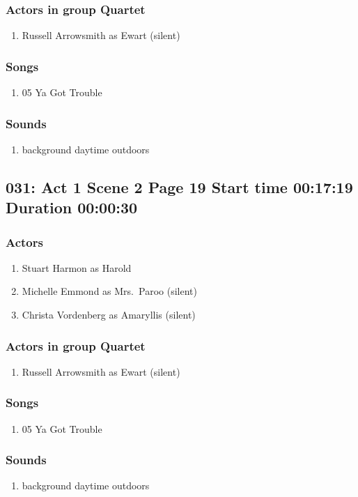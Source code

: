\subsubsection{Actors in group Quartet}
\begin{enumerate}
\item Russell Arrowsmith as Ewart (silent)
\end{enumerate}

\subsubsection{Songs}
\begin{enumerate}
\item 05 Ya Got Trouble
\end{enumerate}\subsubsection{Sounds}
\begin{enumerate}
\item background daytime outdoors
\end{enumerate}
\subsection{031: Act 1 Scene 2 Page 19 Start time 00:17:19 Duration 00:00:30}

\subsubsection{Actors}
\begin{enumerate}
\item Stuart Harmon as Harold
\item Michelle Emmond as Mrs.~Paroo (silent)
\item Christa Vordenberg as Amaryllis (silent)
\end{enumerate}
\subsubsection{Actors in group Quartet}
\begin{enumerate}
\item Russell Arrowsmith as Ewart (silent)
\end{enumerate}

\subsubsection{Songs}
\begin{enumerate}
\item 05 Ya Got Trouble
\end{enumerate}\subsubsection{Sounds}
\begin{enumerate}
\item background daytime outdoors
\end{enumerate}
